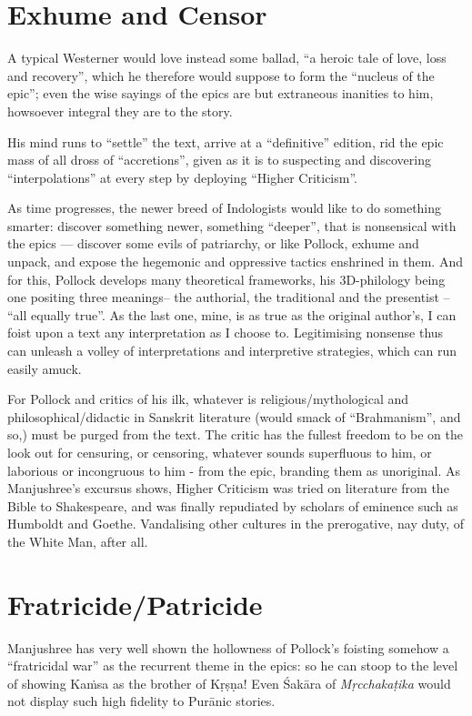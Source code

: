 \section*{Exhume and Censor}

A typical Westerner would love instead some ballad, ``a heroic tale of love, loss and recovery'', which he therefore would suppose to form the ``nucleus of the epic''; even the wise sayings of the epics are but extraneous inanities to him, howsoever integral they are to the story.

His mind runs to “settle” the text, arrive at a “definitive” edition, rid the epic mass of all dross of  “accretions”, given as it is to suspecting and discovering “interpolations” at every step by deploying “Higher Criticism”.

As time progresses, the newer breed of Indologists would like to do something smarter: discover something newer, something “deeper”, that is nonsensical with the epics --- discover some evils of patriarchy, or like Pollock, exhume and unpack, and expose the hegemonic and oppressive tactics enshrined in them. And for this, Pollock develops many theoretical frameworks, his 3D-philology being one positing three meanings-- the authorial, the traditional and the presentist -- “all equally true”. As the last one, mine, is as true as the original author's, I can foist upon a text any interpretation as I choose to. Legitimising nonsense thus can unleash a volley of interpretations and interpretive strategies, which can run easily amuck.

For Pollock and critics of his ilk, whatever is religious/mythological and philosophical/didactic in Sanskrit literature (would smack of “Brahmanism”, and so,) must be purged from the text. The critic has the fullest freedom to be on the look out for censuring, or censoring, whatever sounds superfluous to him, or laborious or incongruous to him - from the epic, branding them as unoriginal. As Manjushree's excursus shows, Higher Criticism was tried on literature from the Bible to Shakespeare, and was finally repudiated by scholars of eminence such as Humboldt and Goethe. Vandalising other cultures in the prerogative, nay duty, of the White Man, after all.

\section*{Fratricide/Patricide}

Manjushree has very well shown the hollowness of Pollock's foisting somehow a “fratricidal war” as the recurrent theme in the epics: so he can stoop to the level of showing Kaṁsa as the brother of Kṛṣṇa! Even Śakāra of {\sl Mṛcchakaṭika} would not display such high fidelity to Purānic stories.

